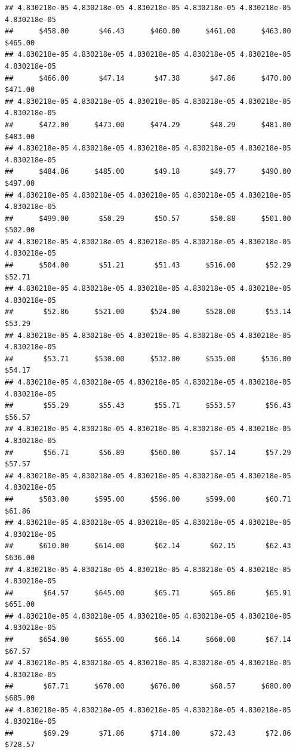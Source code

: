 \begin{verbatim}
## 4.830218e-05 4.830218e-05 4.830218e-05 4.830218e-05 4.830218e-05 4.830218e-05 
##      $458.00       $46.43      $460.00      $461.00      $463.00      $465.00 
## 4.830218e-05 4.830218e-05 4.830218e-05 4.830218e-05 4.830218e-05 4.830218e-05 
##      $466.00       $47.14       $47.38       $47.86      $470.00      $471.00 
## 4.830218e-05 4.830218e-05 4.830218e-05 4.830218e-05 4.830218e-05 4.830218e-05 
##      $472.00      $473.00      $474.29       $48.29      $481.00      $483.00 
## 4.830218e-05 4.830218e-05 4.830218e-05 4.830218e-05 4.830218e-05 4.830218e-05 
##      $484.86      $485.00       $49.18       $49.77      $490.00      $497.00 
## 4.830218e-05 4.830218e-05 4.830218e-05 4.830218e-05 4.830218e-05 4.830218e-05 
##      $499.00       $50.29       $50.57       $50.88      $501.00      $502.00 
## 4.830218e-05 4.830218e-05 4.830218e-05 4.830218e-05 4.830218e-05 4.830218e-05 
##      $504.00       $51.21       $51.43      $516.00       $52.29       $52.71 
## 4.830218e-05 4.830218e-05 4.830218e-05 4.830218e-05 4.830218e-05 4.830218e-05 
##       $52.86      $521.00      $524.00      $528.00       $53.14       $53.29 
## 4.830218e-05 4.830218e-05 4.830218e-05 4.830218e-05 4.830218e-05 4.830218e-05 
##       $53.71      $530.00      $532.00      $535.00      $536.00       $54.17 
## 4.830218e-05 4.830218e-05 4.830218e-05 4.830218e-05 4.830218e-05 4.830218e-05 
##       $55.29       $55.43       $55.71      $553.57       $56.43       $56.57 
## 4.830218e-05 4.830218e-05 4.830218e-05 4.830218e-05 4.830218e-05 4.830218e-05 
##       $56.71       $56.89      $560.00       $57.14       $57.29       $57.57 
## 4.830218e-05 4.830218e-05 4.830218e-05 4.830218e-05 4.830218e-05 4.830218e-05 
##      $583.00      $595.00      $596.00      $599.00       $60.71       $61.86 
## 4.830218e-05 4.830218e-05 4.830218e-05 4.830218e-05 4.830218e-05 4.830218e-05 
##      $610.00      $614.00       $62.14       $62.15       $62.43      $636.00 
## 4.830218e-05 4.830218e-05 4.830218e-05 4.830218e-05 4.830218e-05 4.830218e-05 
##       $64.57      $645.00       $65.71       $65.86       $65.91      $651.00 
## 4.830218e-05 4.830218e-05 4.830218e-05 4.830218e-05 4.830218e-05 4.830218e-05 
##      $654.00      $655.00       $66.14      $660.00       $67.14       $67.57 
## 4.830218e-05 4.830218e-05 4.830218e-05 4.830218e-05 4.830218e-05 4.830218e-05 
##       $67.71      $670.00      $676.00       $68.57      $680.00      $685.00 
## 4.830218e-05 4.830218e-05 4.830218e-05 4.830218e-05 4.830218e-05 4.830218e-05 
##       $69.29       $71.86      $714.00       $72.43       $72.86      $728.57 

\end{verbatim}
